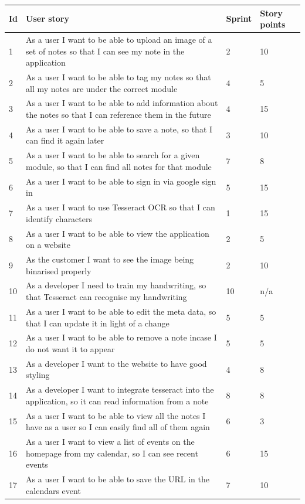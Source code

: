 \begin{table}[h!]
\centering
\begin{tabular}{|p{1cm} p{10cm} p{1cm} p{1cm}|}
   \hline
 Id & User story & Sprint & Story points \\ [0.5ex]
 \hline\hline
 1 & As a user I want to be able to upload an image of a set of notes so that I can see my note in the application & 2	& 10 \\
 2 & As a user I want to be able to tag my notes so that  all my notes are under the correct module	& 4	 & 5 \\
 3&As a user I want to be able to add information about the notes so that I can reference them in the future&4&15 \\
 4&As a user I want to be able to save a note, so that I can find it again later&3&10 \\
 5&As a user I want to be able to search for a given module, so that I can find all notes for that module&7&8 \\
 6&As a user I want to be able to sign in via google sign in&5&15 \\
 7&As a user I want to use Tesseract OCR so that I can identify characters&1&15 \\
 8&As a user I want to be able to view the application on a website&2&5 \\
 9&As the customer I want to see the image being binarised properly&2&10 \\
 10&As a developer I need to train my handwriting, so that Tesseract can recognise my handwriting&10&n/a \\
 11&As a user I want to be able to edit the meta data, so that I can update it in light of a change&5&5 \\
 12&As a user I want to be able to remove a note incase I do not want it to appear&5&5 \\
 13&As a developer I want to the website to have good styling&4&8 \\
 14&As a developer I want to integrate tesseract into the application, so it can read information from a note&8&8 \\
 15&As a user I want to be able to view all the notes I have as a user so I can easily find all of them again&6&3 \\
 16&As a user I want to view a list of events on the homepage from my calendar, so I can see recent events&6&15 \\
 17&As a user I want to be able to save the URL in the calendars event&7&10 \\

\end{tabular}
\end{table}

